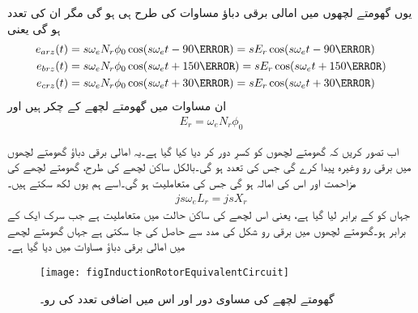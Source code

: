 یوں گھومتے لچھوں میں امالی برقی دباؤ مساوات   کی طرح ہی ہو گی مگر ان کی تعدد  ہو گی یعنی
\begin{gather}
\begin{aligned}\label{مساوات_امالی_گھومتا_حصہ_تین_دور_سائن_نما_برقی_دباؤ}
e_{arz}(t)&=s \omega_e N_r \phi_0 \cos (s \omega_e t -90\degree)=s E_r \cos (s \omega_e t -90\degree)\\
e_{brz}(t)&=s \omega_e N_r \phi_0 \cos (s \omega_e t +150\degree)= s E_r \cos (s \omega_e t +150\degree)\\
e_{crz}(t)&=s \omega_e N_r \phi_0 \cos (s \omega_e t +30\degree)= s E_r \cos (s \omega_e t +30\degree)
\end{aligned}
\end{gather}
ان مساوات میں   گھومتے لچھے کے چکر ہیں اور
\begin{align}
E_r=\omega_e N_r \phi_0
\end{align}

اب تصور کریں کہ گھومتے لچھوں کو کسرِ دور کر دیا کیا گیا ہے۔یہ امالی برقی دباؤ گھومتے لچھوں میں برقی رو   وغیرہ پیدا کرے گی جس کی تعدد  ہو گی۔بالکل ساکن لچھے کی طرح، گھومتے لچھے کی مزاحمت  اور اس کی امالہ  ہو گی جس کی متعاملیت  ہو گی۔اسے ہم یوں لکھ سکتے ہیں۔
\begin{align}
j s \omega_e L_r = j s  X_r
\end{align}
جہاں  کو  کے برابر لیا گیا ہے، یعنی  اس لچھے کی ساکن حالت میں متعاملیت ہے جب سرک ایک کے برابر ہو۔گھومتے لچھوں میں برقی رو  شکل   کی مدد سے حاصل کی جا سکتی ہے جہاں گھومتے  لچھے میں امالی برقی دباؤ  مساوات   میں دیا گیا ہے۔
\begin{figure}
\centering
\texttt{[image: figInductionRotorEquivalentCircuit]}
\caption{گھومتے لچھے کی مساوی دور اور اس میں اضافی تعدد کی رو۔}
\label{شکل_امالی_گھومتی_لچھوں_کا_مساوی_دور}
\end{figure}

